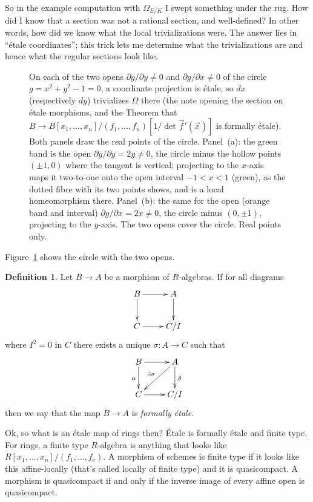 \documentclass[12pt]{article}
\numberwithin{equation}{section}
\theoremstyle{definition}
\newtheorem{definition}[theorem]{Definition}
\theoremstyle{remark}
\begin{document}
So in the example computation with $\Omega_{E/K}$ I swept something under the rug. 
How did I know that a section was not a rational section, and well-defined?
In other words, how did we know what the local trivializations were. 
The answer lies in ``\'etale coordinates''; this trick lets me determine what the trivializations are and hence what the regular sections look like.

\begin{figure}[H]
\centering

\caption{On each of the two opens $\partial g/\partial y\neq0$ and $\partial g/\partial x\neq0$ of the circle $g=x^2+y^2-1=0$, a coordinate projection is \'etale, so $dx$ (respectively $dy$) trivializes $\Omega$ there (the note opening the section on \'etale morphisms, and the Theorem that $B\to B[x_1,\dots,x_n]/(f_1,\dots,f_n)[1/\det\vec f'(\vec x)]$ is formally \'etale). Both panels draw the real points of the circle. Panel~(a): the green band is the open $\partial g/\partial y=2y\neq0$, the circle minus the hollow points $(\pm1,0)$ where the tangent is vertical; projecting to the $x$-axis maps it two-to-one onto the open interval $-1<x<1$ (green), as the dotted fibre with its two points shows, and is a local homeomorphism there. Panel~(b): the same for the open (orange band and interval) $\partial g/\partial x=2x\neq0$, the circle minus $(0,\pm1)$, projecting to the $y$-axis. The two opens cover the circle. Real points only.}\label{fig:circle-etale-charts}
\end{figure}
Figure~\ref{fig:circle-etale-charts} shows the circle with the two opens.

\begin{definition}
	Let $B \to A$ be a morphism of $R$-algebras.
	If for all diagrams 
	$$\xymatrix{
		B \ar[r] \ar[d] & A\ar[d] \\
		C \ar[r] & C/I 
	}$$
	where $I^2=0$ in $C$ there exists a unique $\sigma:A \to C$ such that 
	\begin{equation}\label{eqn:infinitesimal-lifting}
	\xymatrix{
		B \ar[r] \ar[d]_{\alpha}& A\ar[d]^{\beta} \ar[dl]_{\exists \sigma} \\
		C \ar[r] & C/I 
	}
	\end{equation}
	then we say that the map $B\to A$ is \emph{formally \'etale}.	
\end{definition}

Ok, so what is an \'etale map of rings then? \'Etale is formally \'etale and finite type. 
For rings, a finite type $R$-algebra is anything that looks like  $R[x_1,\ldots,x_n]/(f_1,\ldots,f_e)$. 
A morphism of schemes is finite type if it looks like this affine-locally (that's called locally of finite type) and it is quasicompact.
A morphism is quasicompact if and only if the inverse image of every affine open is quasicompact. 
\end{document}
